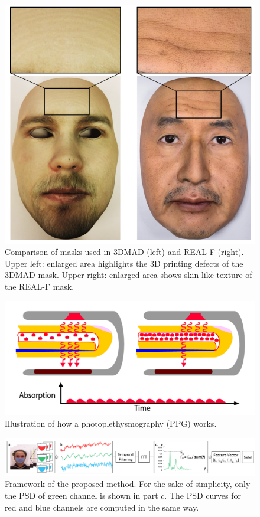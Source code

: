 \documentclass[journal]{IEEEtran}
\begin{document}
\begin{figure}[!t]
	\centering
	\includegraphics[width=0.7\linewidth]{img/F_1}
	\caption{Comparison of masks used in 3DMAD (left) and REAL-F (right). Upper left: enlarged area highlights the 3D printing defects of the 3DMAD mask. Upper right: enlarged area shows skin-like texture of the REAL-F mask.}
	\label{fig_F_1}
\end{figure}

\begin{figure}[!t]
	\centering
	\includegraphics[width=1\linewidth]{img/F_2}
	\caption{Illustration of how a photoplethysmography (PPG) works.}
	\label{fig_F_2}
\end{figure}

\begin{figure}[!t]
	\centering
	\includegraphics[width=1\linewidth]{img/F_3}
	\caption{Framework of the proposed method. For the sake of simplicity, only the PSD of green channel is shown in part $c$. The PSD curves for red and blue channels are computed in the same way.}
	\label{fig_F_3}
\end{figure}
\end{document}
